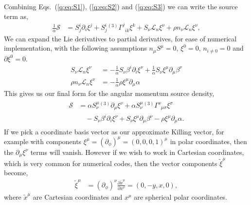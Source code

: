 Combining Eqs.~(\ref{q:eq:S1}), (\ref{q:eq:S2}) and (\ref{q:eq:S3}) we can write the source term as,
\begin{align}
\frac{1}{\alpha}\mathcal{S} &= S^i_{j}\partial_i \xi^j + S^i_{j} {}^{(3)}\Gamma^j_{\,\,\,i k} \xi^k + S_\nu \mathcal{L}_n \xi^\nu + \rho n_\nu \mathcal{L}_n \xi^\nu,
\end{align}
We can expand the Lie derivatives to partial derivatives, for ease of numerical implementation, with the following assumptions $n_\mu S^\mu = 0$, $\xi^0 = 0$, $n_{i\neq0}=0$ and $\partial \xi^0 = 0$.
\begin{align}
S_\nu \mathcal{L}_n \xi^\nu &= -\frac{1}{\alpha} S_\nu \beta^i \partial_i \xi^\nu  + \frac{1}{\alpha}S_\nu \xi^\mu \partial_\mu \beta^\nu \\
\rho n_\nu \mathcal{L}_n \xi^\nu &= -\frac{1}{\alpha} \rho \xi^\mu \partial_\mu \alpha
\end{align}
This gives us our final form for the angular momentum source density,
\begin{align}\label{q:s_explicit}
\begin{split}
\mathcal{S} &= \alpha S^\mu_{\nu}{}^{(3)}\partial_\mu \xi^\nu + \alpha S^\mu_{\nu} {}^{(3)}\Gamma^\nu_{\,\,\,\mu \sigma} \xi^\sigma \\&\quad- S_\nu \beta^i \partial_i \xi^\nu  + S_\nu \xi^\mu \partial_\mu \beta^\nu - \rho \xi^\mu \partial_\mu \alpha.
\end{split}
\end{align}
If we pick a coordinate basis vector as our approximate Killing vector, for example with components $\xi^\mu = (\partial_\phi)^\mu =(0,0,0,1)^\mu$ in polar coordinates, then the $\partial_\mu \xi^\nu$ terms will vanish. However if we wish to work in Cartesian coordinates, which is very common for numerical codes, then the vector components $\tilde\xi^\mu$ become,
\begin{align}
\tilde \xi ^\mu  &= (\partial_\phi)^\nu \frac{\partial \tilde x^\mu}{\partial x^\nu}=  (0,-y,x,0),
\end{align}
where $\tilde x^\mu$ are Cartesian coordinates and $x^\mu$ are spherical polar coordinates.



